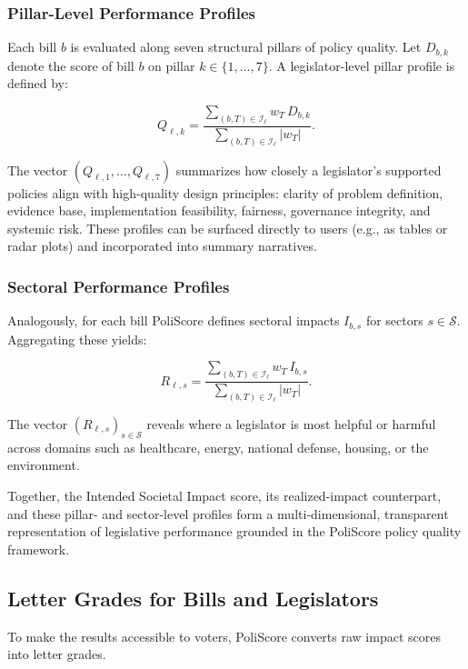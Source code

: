 \documentclass[12pt]{article}
\begin{document}
\subsubsection{Pillar-Level Performance Profiles}

Each bill $b$ is evaluated along seven structural pillars of policy quality.
Let $D_{b,k}$ denote the score of bill $b$ on pillar $k \in \{1,\dots,7\}$. A
legislator-level pillar profile is defined by:

\[
Q_{\ell,k} =
\frac{\sum_{(b, T) \in \mathcal{I}_{\ell}} w_T \, D_{b,k}}
     {\sum_{(b, T) \in \mathcal{I}_{\ell}} |w_T|}.
\]

The vector $(Q_{\ell,1}, \ldots, Q_{\ell,7})$ summarizes how closely a
legislator’s supported policies align with high-quality design principles:
clarity of problem definition, evidence base, implementation feasibility,
fairness, governance integrity, and systemic risk. These profiles can be
surfaced directly to users (e.g., as tables or radar plots) and incorporated
into summary narratives.

\subsubsection{Sectoral Performance Profiles}

Analogously, for each bill PoliScore defines sectoral impacts $I_{b,s}$ for
sectors $s \in \mathcal{S}$. Aggregating these yields:

\[
R_{\ell,s} =
\frac{\sum_{(b, T) \in \mathcal{I}_{\ell}} w_T \, I_{b,s}}
     {\sum_{(b, T) \in \mathcal{I}_{\ell}} |w_T|}.
\]

The vector $(R_{\ell,s})_{s \in \mathcal{S}}$ reveals where a legislator is most
helpful or harmful across domains such as healthcare, energy, national defense,
housing, or the environment.

Together, the Intended Societal Impact score, its realized-impact counterpart,
and these pillar- and sector-level profiles form a multi-dimensional,
transparent representation of legislative performance grounded in the
PoliScore policy quality framework.

\subsection{Letter Grades for Bills and Legislators}

To make the results accessible to voters, PoliScore converts raw impact scores into letter grades.
\end{document}
